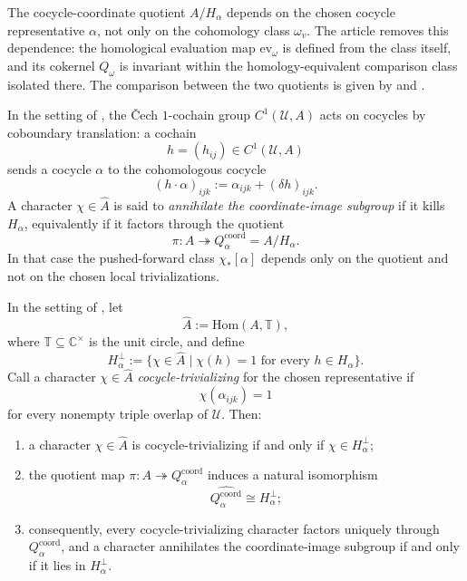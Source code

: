 The cocycle-coordinate quotient $A/H_\alpha$ depends on the chosen cocycle representative $\alpha$, not only on the cohomology class $\omega_v$. The article removes this dependence: the homological evaluation map $\mathrm{ev}_\omega$ is defined from the class itself, and its cokernel $Q_\omega$ is invariant within the homology-equivalent comparison class isolated there. The comparison between the two quotients is given by
 and
.

\begin{definition}\label{def:gauge-invariance-character}
In the setting of , the \v{C}ech $1$-cochain group $C^1(\mathcal U,A)$ acts on cocycles by coboundary translation: a cochain
\[
h=(h_{ij})\in C^1(\mathcal U,A)
\]
sends a cocycle $\alpha$ to the cohomologous cocycle
\[
(h\cdot\alpha)_{ijk}:=\alpha_{ijk}+(\delta h)_{ijk}.
\]
A character $\chi\in\widehat A$ is said to \emph{annihilate the coordinate-image subgroup} if it kills $H_\alpha$, equivalently if it factors through the quotient
\[
\pi:A\twoheadrightarrow Q_{\alpha}^{\mathrm{coord}}=A/H_\alpha.
\]
In that case the pushed-forward class $\chi_*[\alpha]$ depends only on the quotient and not on the chosen local trivializations.
\end{definition}

\begin{theorem}\label{thm:character-definability-barrier}
In the setting of , let
\[
\widehat A:=\mathrm{Hom}(A,\mathbb T),
\]
where $\mathbb T\subseteq\mathbb C^\times$ is the unit circle, and define
\[
H_\alpha^\perp:=\{\chi\in\widehat A\mid \chi(h)=1\text{ for every }h\in H_\alpha\}.
\]
Call a character $\chi\in\widehat A$ \emph{cocycle-trivializing} for the chosen representative if
\[
\chi(\alpha_{ijk})=1
\]
for every nonempty triple overlap of $\mathcal U$. Then:
\begin{enumerate}[label=(\roman*),nosep]
\item a character $\chi\in\widehat A$ is cocycle-trivializing if and only if $\chi\in H_\alpha^\perp$;
\item the quotient map $\pi:A\twoheadrightarrow Q_{\alpha}^{\mathrm{coord}}$ induces a natural isomorphism
\[
\widehat{Q_{\alpha}^{\mathrm{coord}}}\cong H_\alpha^\perp;
\]
\item consequently, every cocycle-trivializing character factors uniquely through $Q_{\alpha}^{\mathrm{coord}}$, and a character annihilates the coordinate-image subgroup if and only if it lies in $H_\alpha^\perp$.
\end{enumerate}
\end{theorem}

